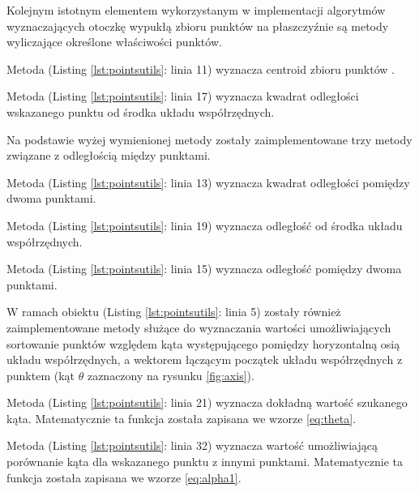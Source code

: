    		
   		Kolejnym istotnym elementem wykorzystanym w implementacji algorytmów wyznaczających otoczkę wypukłą zbioru punktów na płaszczyźnie są metody wyliczające określone właściwości punktów.
   		
   		Metoda  (Listing \ref{lst:pointsutils}: linia 11) wyznacza centroid zbioru punktów .
   		
   		Metoda  (Listing \ref{lst:pointsutils}: linia 17) wyznacza kwadrat odległości wskazanego punktu od środka układu współrzędnych.
   		
   		Na podstawie wyżej wymienionej metody zostały zaimplementowane trzy metody związane z odległością między punktami.
   		
   		Metoda  (Listing \ref{lst:pointsutils}: linia 13) wyznacza kwadrat odległości pomiędzy dwoma punktami.
   		
   		Metoda  (Listing \ref{lst:pointsutils}: linia 19) wyznacza odległość od środka układu współrzędnych.
   		
   		Metoda  (Listing \ref{lst:pointsutils}: linia 15) wyznacza odległość pomiędzy dwoma punktami.

		W ramach obiektu  (Listing \ref{lst:pointsutils}: linia 5) zostały również zaimplementowane metody służące do wyznaczania wartości umożliwiających sortowanie punktów względem kąta występującego pomiędzy horyzontalną osią układu współrzędnych, a wektorem łączącym początek układu współrzędnych z punktem (kąt $\theta$ zaznaczony na rysunku \ref{fig:axis}).
		
		Metoda  (Listing \ref{lst:pointsutils}: linia 21) wyznacza dokładną wartość szukanego kąta. Matematycznie ta funkcja została zapisana we wzorze \ref{eq:theta}.
		
		Metoda  (Listing \ref{lst:pointsutils}: linia 32) wyznacza wartość umożliwiającą porównanie kąta dla wskazanego punktu z innymi punktami. Matematycznie ta funkcja została zapisana we wzorze \ref{eq:alpha1}.
   		
   		
   		\newpage
   		
